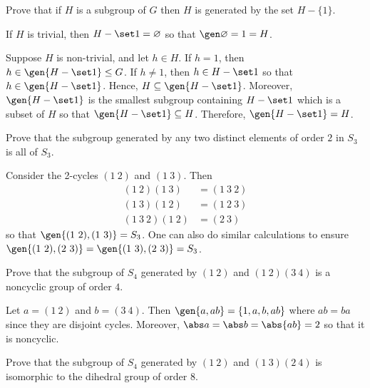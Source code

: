 \begin{exercise}\label{ex2.4.4}
    Prove that if $H$ is a subgroup of $G$ then $H$ is generated by the set $H - \{1\}$.
\end{exercise}

\begin{sol}
    If $H$ is trivial, then $H - \set 1 = \varnothing$ so that $\gen\varnothing = 1 = H$.

    Suppose $H$ is non-trivial, and let $h \in H$. If $h = 1$, then $h \in \gen{H - \set 1} \leq G$. If $h \neq 1$, then $h \in H - \set 1$ so that $h \in \gen{H - \set 1}$. Hence, $H \subseteq \gen{H - \set 1}$. Moreover, $\gen{H - \set 1}$ is the smallest subgroup containing $H - \set 1$ which is a subset of $H$ so that $\gen{H - \set 1} \subseteq H$. Therefore, $\gen{H - \set 1} = H$.
\end{sol}

\begin{exercise}\label{ex2.4.5}
    Prove that the subgroup generated by any two distinct elements of order $2$ in $S_3$ is all of $S_3$.
\end{exercise}

\begin{sol}
    Consider the 2-cycles $(1\ 2)$ and $(1\ 3)$. Then
    \begin{align*}
        (1\ 2)(1\ 3) & = (1\ 3\ 2) \\
        (1\ 3)(1\ 2) & = (1\ 2\ 3) \\
        (1\ 3\ 2)(1\ 2) & = (2\ 3)
    \end{align*}
    so that $\gen{(1\ 2), (1\ 3)} = S_3$. One can also do similar calculations to ensure $\gen{(1\ 2), (2\ 3)} = \gen{(1\ 3), (2\ 3)} = S_3$.
\end{sol}

\begin{exercise}\label{ex2.4.6}
    Prove that the subgroup of $S_4$ generated by $(1\ 2)$ and $(1\ 2)(3\ 4)$ is a noncyclic group of order $4$.
\end{exercise}

\begin{sol}
    Let $a = (1\ 2)$ and $b = (3\ 4)$. Then $\gen{a, ab} = \{1, a, b, ab\}$ where $ab = ba$ since they are disjoint cycles. Moreover, $\abs a = \abs b = \abs{ab} = 2$ so that it is noncyclic.
\end{sol}

\begin{exercise}\label{ex2.4.7}
    Prove that the subgroup of $S_4$ generated by $(1\ 2)$ and $(1\ 3)(2\ 4)$ is isomorphic to the dihedral group of order $8$.
\end{exercise}


